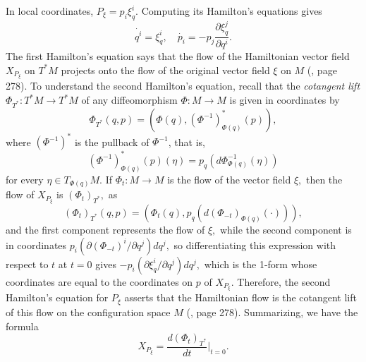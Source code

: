 \documentclass[12pt, letterpaper, reqno]{amsart}
\theoremstyle{definition}
\theoremstyle{plain}
\theoremstyle{remark}
\begin{document}
In local coordinates, $ P_\xi = p_i \xi_q^i. $ Computing its Hamilton's equations gives
$$ \dot{q^i} = \xi_q^i,\quad \dot{p_i} = -p_j \frac{\partial \xi_q^j}{\partial q^i}.  $$ 
The first Hamilton's equation says that the flow of the Hamiltonian vector field $ X_{P_\xi} $ on $ T^*M $ projects onto the flow of the original vector field $ \xi $ on $ M $ (\cite{montgomery2002tour}, page 278). To understand the second Hamilton's equation, recall that the \textit{cotangent lift} $ \Phi_{T^*}: T^*M \rightarrow T^*M $ of any diffeomorphism $ \Phi : M \rightarrow M $ is given in coordinates by 
$$ \Phi_{T^*}(q,p) = (\Phi(q), (\Phi^{-1})^*_{\Phi(q)}(p)), $$ 
where $ (\Phi^{-1})^* $ is the pullback of $ \Phi^{-1} $, that is,
$$ (\Phi^{-1})^*_{\Phi(q)}(p)(\eta) = p_q \left( d\Phi^{-1}_{\Phi(q)}(\eta) \right) $$ 
for every $ \eta\in T_{\Phi(q)}M. $ If $ \Phi_t: M \rightarrow M $ is the flow of the vector field $ \xi, $ then the flow of $ X_{P_\xi} $ is $ (\Phi_t)_{T^*}, $ as
$$ (\Phi_t)_{T^*}(q,p) = \left( \Phi_t(q), p_q \left( d(\Phi_{-t})_{\Phi(q)}(\cdot) \right) \right), $$ 
and the first component represents the flow of $ \xi, $ while the second component is in coordinates $ p_i (\partial (\Phi_{-t})^i/\partial q^j)dq^j, $ so differentiating this expression with respect to $ t $ at $ t=0 $ gives $ -p_i (\partial \xi_q^i/\partial q^j)dq^j, $ which is the 1-form whose coordinates are equal to the coordinates on $ p $ of $ X_{P_\xi} $. Therefore, the second Hamilton's equation for $ P_\xi $ asserts that the Hamiltonian flow is the cotangent lift of this flow on the configuration space $ M $ (\cite{montgomery2002tour}, page 278). Summarizing, we have the formula 
$$ X_{P_\xi} = \frac{d(\Phi_t)_{T^*}}{dt} \Big|_{t=0}.  $$ 
\end{document}
